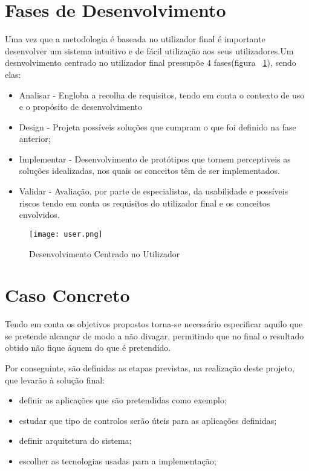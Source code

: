 \section{Fases de Desenvolvimento}

Uma vez que a metodologia é baseada no utilizador final é importante desenvolver um sistema intuitivo e de fácil utilização aos seus utilizadores.Um desnvolvimento centrado no utilizador final pressupõe 4 fases(figura ~\ref{fig:user-center}), sendo elas:
\begin{itemize}
\item Analisar - Engloba a recolha de requisitos, tendo em conta o contexto de uso e o propósito de desenvolvimento
\item Design - Projeta possíveis soluções que cumpram o que foi definido na fase anterior;
\item Implementar - Desenvolvimento de protótipos que tornem perceptiveis as soluções idealizadas, nos quais os conceitos têm de ser implementados.
\item Validar - Avaliação, por parte de especialistas, da usabilidade e possíveis riscos tendo em conta os requisitos do utilizador final e os conceitos envolvidos.
\end{itemize} 

\begin{figure}[h]
\centering
\texttt{[image: user.png]}
\caption[Desenvolvimento Centrado no Utilizador] {Desenvolvimento Centrado no Utilizador\protect\footnotemark}
\label{fig:user-center}
\end{figure}


\pagebreak

\section{Caso Concreto}

	Tendo em conta os objetivos propostos torna-se necessário especificar aquilo que se pretende alcançar de modo a não divagar, permitindo que no final o resultado obtido não fique áquem do que é pretendido.

	Por conseguinte, são definidas as etapas previstas, na realização deste projeto, que levarão à solução final:

	\begin{itemize}
		\item definir as aplicações que são pretendidas como exemplo;
		\item estudar que tipo de controlos serão úteis para as aplicações definidas;
		\item definir arquitetura do sistema;
		\item escolher as tecnologias usadas para a implementação;
	\end{itemize}  

